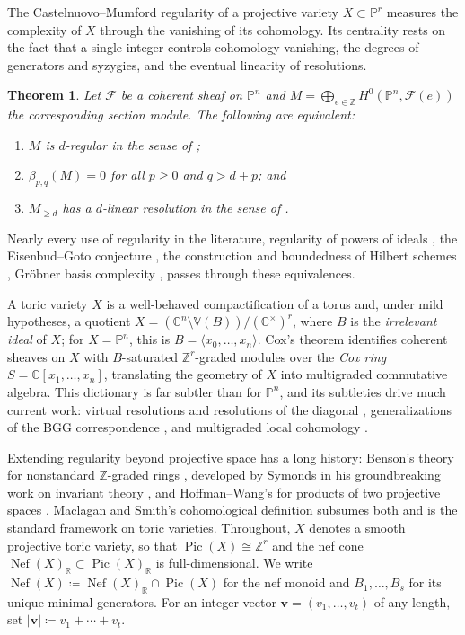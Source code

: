 \documentclass[11pt,reqno]{amsart}
\newtheorem{theorem}[lemma]{Theorem}
\theoremstyle{remark}
\newcommand{\Pic}{\operatorname{Pic}}
\newcommand{\Nef}{\operatorname{Nef}}
\newcommand{\vv}{\mathbf{v}}
\newcommand{\CC}{\mathbb{C}}
\newcommand{\PP}{\mathbb{P}}
\newcommand{\RR}{\mathbb{R}}
\newcommand{\VV}{\mathbb{V}}
\newcommand{\ZZ}{\mathbb{Z}}
\newcommand{\cF}{\mathcal{F}}
\begin{document}
The Castelnuovo--Mumford regularity of a projective variety $X\subset \PP^{r}$ measures the complexity of $X$ through the vanishing of its cohomology. Its centrality rests on the fact that a single integer controls cohomology vanishing, the degrees of generators and syzygies, and the eventual linearity of resolutions.

\begin{theorem}\cite{eisenbudGoto84}\label{thm:eisenbud-goto}
Let $\cF$ be a coherent sheaf on $\PP^{n}$ and $M=\bigoplus_{e\in\ZZ} H^0(\PP^{n},\cF(e))$ the corresponding section module. The following are equivalent:
\begin{enumerate}
\item $M$ is $d$-regular in the sense of \cite[Lect.~14]{mumford66};
\item $\beta_{p,q}(M)=0$ for all $p\geq0$ and $q>d+p$; and
\item $M_{\geq d}$ has a $d$-linear resolution in the sense of \cite{eisenbudGoto84}.
\end{enumerate}
\end{theorem}

Nearly every use of regularity in the literature, regularity of powers of ideals \cite{CHT99,Kodiyalam00}, the Eisenbud--Goto conjecture \cite{MP18}, the construction and boundedness of Hilbert schemes \cite{grothendieck61,gotzmann78}, Gr\"obner basis complexity \cite{bayerStillman87}, passes through these equivalences.

A toric variety $X$ is a well-behaved compactification of a torus and, under mild hypotheses, a quotient $X=(\CC^{n}\setminus \VV(B))/(\CC^{\times})^r$, where $B$ is the \emph{irrelevant ideal} of $X$; for $X = \PP^n$, this is $B=\langle x_0,\ldots,x_n\rangle$. Cox's theorem \cite{cox95} identifies coherent sheaves on $X$ with $B$-saturated $\ZZ^r$-graded modules over the \emph{Cox ring} $S=\CC[x_1,\ldots,x_n]$, translating the geometry of $X$ into multigraded commutative algebra. This dictionary is far subtler than for $\PP^n$, and its subtleties drive much current work: virtual resolutions and resolutions of the diagonal \cite{BES20, HHL24, brownErman24-1, faveroHuang23}, generalizations of the BGG correspondence \cite{EES15,brownErmanTate}, and multigraded local cohomology \cite{botbolChardin17, chardinNemati20}.

Extending regularity beyond projective space has a long history: Benson's theory for nonstandard $\ZZ$-graded rings \cite{benson04}, developed by Symonds in his groundbreaking work on invariant theory \cite{symonds10,symonds11}, and Hoffman--Wang's for products of two projective spaces \cite{hoffmanWang04}. Maclagan and Smith's cohomological definition \cite{maclaganSmith04} subsumes both and is the standard framework on toric varieties. Throughout, $X$ denotes a smooth projective toric variety, so that $\Pic(X)\cong \ZZ^r$ and the nef cone $\Nef(X)_{\RR} \subset \Pic(X)_{\RR}$ is full-dimensional. We write $\Nef(X)\coloneqq \Nef(X)_{\RR} \cap \Pic(X)$ for the nef monoid and $B_{1},\ldots,B_{s}$ for its unique minimal generators. For an integer vector $\vv=(v_1,\ldots,v_t)$ of any length, set $|\vv|\coloneqq v_1+\cdots+v_t$.
\end{document}
